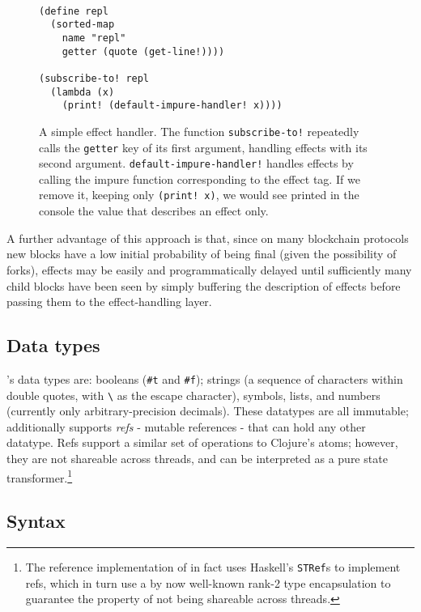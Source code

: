 \begin{figure}[H]
\begin{verbatim}

(define repl
  (sorted-map
    name "repl"
    getter (quote (get-line!))))

(subscribe-to! repl
  (lambda (x)
    (print! (default-impure-handler! x))))

\end{verbatim}
    \caption{A simple effect handler. The function \texttt{subscribe-to!}
    repeatedly calls the \texttt{getter} key of its first argument, handling
    effects with its second argument. \texttt{default-impure-handler!} handles
    effects by calling the impure function corresponding to the effect tag. If
    we remove it, keeping only \texttt{(print! x)}, we would see printed in the
    console the value that describes an effect only.}
\label{f:eff-handler}
\end{figure}

A further advantage of this approach is that, since on many blockchain
protocols new blocks have a low initial probability of being final (given the
possibility of forks), effects may be easily and programmatically delayed until
sufficiently many child blocks have been seen by simply buffering the
description of effects before passing them to the effect-handling layer.

\subsection{Data types} \rad's data types are: booleans (\texttt{\#t} and
\texttt{\#f}); strings (a sequence of characters within double quotes, with
\texttt{\textbackslash} as the escape character), symbols, lists, and numbers
(currently only arbitrary-precision decimals). These datatypes are all
immutable; additionally \rad supports \textit{refs} - mutable references - that
can hold any other datatype. Refs support a similar set of operations to
Clojure's atoms; however, they are not shareable across threads, and can be
interpreted as a pure state transformer.\footnote{The reference implementation
of \rad in fact uses Haskell's \texttt{STRef}s to implement refs, which in turn
use a by now well-known rank-2 type encapsulation to guarantee the property of
not being shareable across threads.\cite{lazy-functional-state-threads}}

\subsection{Syntax}


